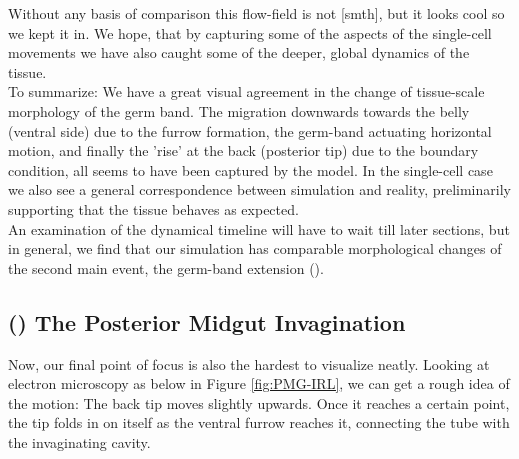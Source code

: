 Without any basis of comparison this flow-field is not [smth], but it looks cool so we kept it in.
We hope, that by capturing some of the aspects of the single-cell movements we have also caught some of the deeper, global dynamics of the tissue.\\

To summarize: We have a great visual agreement in the change of tissue-scale morphology of the germ band. The migration downwards towards the belly (ventral side) due to the furrow formation, the germ-band actuating horizontal motion, and finally the 'rise' at the back (posterior tip) due to the boundary condition, all seems to have been captured by the model. In the single-cell case we also see a general correspondence between simulation and reality, preliminarily supporting that the tissue behaves as expected.\\  


An examination of the dynamical timeline will have to wait till later sections, but in general, we find that our simulation has comparable morphological changes of the second main event, the germ-band extension ().


\subsection{() The Posterior Midgut Invagination }
Now, our final point of focus is also the hardest to visualize neatly. Looking at electron microscopy as below in Figure \ref{fig:PMG-IRL}, we can get a rough idea of the motion:
The back tip moves slightly upwards. Once it reaches a certain point, the tip folds in on itself as the ventral furrow reaches it, connecting the tube with the invaginating cavity.\cite{campos2013embryonic}

